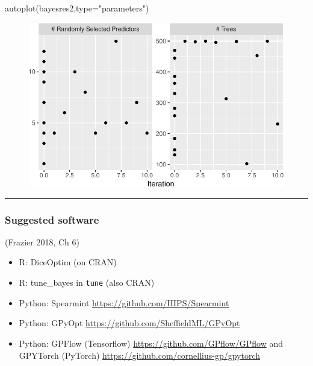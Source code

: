 \documentclass[
  letterpaper,
  DIV=11,
  numbers=noendperiod]{scrartcl}
\newenvironment{Shaded}{\begin{snugshade}}{\end{snugshade}}
\newcommand{\AttributeTok}[1]{\textcolor[rgb]{0.40,0.45,0.13}{#1}}
\newcommand{\FunctionTok}[1]{\textcolor[rgb]{0.28,0.35,0.67}{#1}}
\newcommand{\NormalTok}[1]{\textcolor[rgb]{0.00,0.23,0.31}{#1}}
\newcommand{\StringTok}[1]{\textcolor[rgb]{0.13,0.47,0.30}{#1}}
\begin{document}
\begin{Shaded}
\begin{Highlighting}[]
\FunctionTok{autoplot}\NormalTok{(bayesres2,}\AttributeTok{type=}\StringTok{"parameters"}\NormalTok{)}
\end{Highlighting}
\end{Shaded}

\begin{figure}[H]

{\centering \includegraphics{L16_files/figure-pdf/unnamed-chunk-6-2.pdf}

}

\end{figure}

\begin{center}\rule{0.5\linewidth}{0.5pt}\end{center}

\hypertarget{suggested-software}{%
\subsubsection{Suggested software}\label{suggested-software}}

(Frazier 2018, Ch 6)

\begin{itemize}
\item
  R: DiceOptim (on CRAN)
\item
  R: tune\_bayes in \texttt{tune} (also CRAN)
\item
  Python: Spearmint \url{https://github.com/HIPS/Spearmint}
\item
  Python: GPyOpt \url{https://github.com/SheffieldML/GPyOpt}
\item
  Python: GPFlow (Tensorflow) \url{https://github.com/GPflow/GPflow} and
  GPYTorch (PyTorch) \url{https://github.com/cornellius-gp/gpytorch}
\end{itemize}
\end{document}
